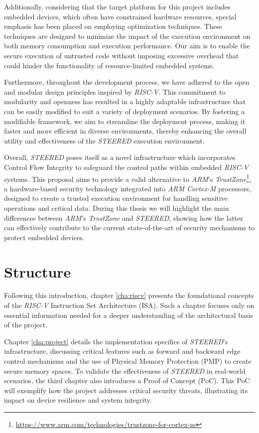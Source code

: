 Additionally, considering that the target platform for this project includes embedded
devices, which often have constrained hardware resources, special emphasis has been
placed on employing optimization techniques. These techniques are designed to
minimize the impact of the execution environment on both memory consumption and
execution performance. Our aim is to enable the secure execution of untrusted code
without imposing excessive overhead that could hinder the functionality of resource-limited
embedded systems.

Furthermore, throughout the development process, we have adhered to the open and
modular design principles inspired by \textit{RISC-V}. This commitment to modularity
and openness has resulted in a highly adaptable infrastructure that can be easily
modified to suit a variety of deployment scenarios. By fostering a modifiable
framework, we aim to streamline the deployment process, making it faster and
more efficient in diverse environments, thereby enhancing the overall utility and
effectiveness of the \textit{STEERED} execution environment.

Overall, \textit{STEERED} poses itself as a novel infrastructure which
incorporates Control Flow Integrity to safeguard the control paths within
embedded \textit{RISC-V} systems. This proposal aims to provide a valid
alternative to \textit{ARM}'s \textit{TrustZone}\footnote{\url{https://www.arm.com/technologies/trustzone-for-cortex-m}},
a hardware-based security technology integrated into \textit{ARM Cortex-M} processors,
designed to create a trusted execution environment for handling sensitive
operations and critical data. During this thesis we will highlight the main differences
between \textit{ARM}'s \textit{TrustZone} and \textit{STEERED}, showing how the latter
can effectively contribute to the current state-of-the-art of security mechanisms
to protect embedded devices.

\section{Structure}
\label{sec:intro_structure}

Following this introduction, chapter \ref{cha:riscv} presents the foundational concepts
of the \textit{RISC-V} Instruction Set Architecture (ISA). Such a chapter focuses
only on essential information needed for a deeper understanding of the architectural
basis of the project.

Chapter \ref{cha:project} details the implementation specifics of \textit{STEERED}'s
infrastructure, discussing critical features such as forward and backward edge control
mechanisms and the use of Physical Memory Protection (PMP) to create secure memory
spaces. To validate the effectiveness of \textit{STEERED} in real-world scenarios,
the third chapter also introduces a Proof of Concept (PoC). This PoC will exemplify
how the project addresses critical security threats, illustrating its impact on
device resilience and system integrity.

